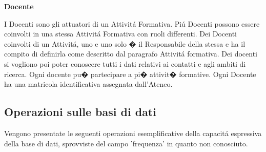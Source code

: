 \documentclass[a4paper,12pt,italian,towside]{article}
\begin{document}
\textbf{Docente}
\par
I Docenti sono gli attuatori di un Attivit\'a Formativa. Pi\'u Docenti possono essere coinvolti in una stessa Attivit\'a Formativa con ruoli differenti. Dei Docenti coinvolti di un Attivit\'a, uno e uno solo � il Responsabile della stessa e ha il compito di definirla come descritto dal paragrafo Attivit\'a formativa. Dei docenti si vogliono poi poter conoscere tutti i dati relativi ai contatti e agli ambiti di ricerca. Ogni docente pu� partecipare a pi� attivit� formative. Ogni Docente ha una matricola identificativa assegnata dall'Ateneo.\\


\newpage
\subsection{Operazioni sulle basi di dati}
Vengono presentate le seguenti operazioni esemplificative della capacit\'a espressiva della base di dati, sprovviste del campo 'frequenza' in quanto non conosciuto.
\end{document}
